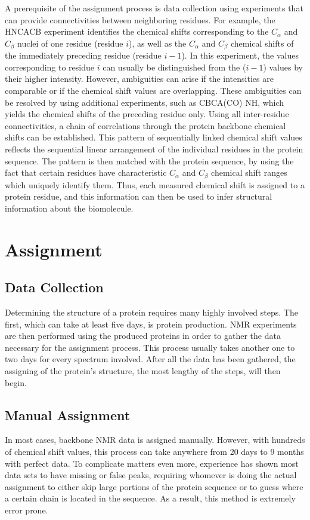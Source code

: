\documentclass[12pt, letter]{article}
\begin{document}
A prerequisite of the assignment process is data collection using experiments that can provide connectivities between neighboring residues. For example, the HNCACB experiment identifies the chemical shifts corresponding to the $C_\alpha$ and $C_{\beta}$ nuclei of one residue (residue $i$), as well as the $C_\alpha$ and $C_{\beta}$ chemical shifts of the immediately preceding residue (residue $i -1$). In this experiment, the values corresponding to residue $i$ can usually be distinguished from the ($i -1$) values by their higher intensity. However, ambiguities can arise if the intensities are comparable or if the chemical shift values are overlapping. These ambiguities can be resolved by using additional experiments, such as CBCA(CO) NH, which yields the chemical shifts of the preceding residue only. Using all inter-residue connectivities, a chain of correlations through the protein backbone chemical shifts can be established.  This pattern of sequentially linked chemical shift values reflects the sequential linear arrangement of the individual residues in the protein sequence. The pattern is then matched with the protein sequence, by using the fact that certain residues have characteristic $C_\alpha$ and $C_{\beta}$ chemical shift ranges which uniquely identify them. Thus, each measured chemical shift is assigned to a protein residue, and this information can then be used to infer structural information about the biomolecule.

\section{Assignment} %
\label{sec:method}

\subsection{Data Collection} %
\label{sub:data_collection}
Determining the structure of a protein requires many highly involved steps. The first, which can take at least five days, is protein production. NMR experiments are then performed using the produced proteins in order to gather the data necessary for the assignment process. This process usually takes another one to two days for every spectrum involved. After all the data has been gathered, the assigning of the protein's structure, the most lengthy of the steps, will then begin. \cite{babak_alipanahi_error_2011}

\subsection{Manual Assignment} %
\label{sub:manual_assignment}
In most cases, backbone NMR data is assigned manually. However, with hundreds of chemical shift values, this process can take anywhere from 20 days to 9 months with perfect data. To complicate matters even more, experience has shown most data sets to have missing or false peaks, requiring whomever is doing the actual assignment to either skip large portions of the protein sequence or to guess where a certain chain is located in the sequence. As a result, this method is extremely error prone. \cite{babak_alipanahi_error_2011}
\end{document}
